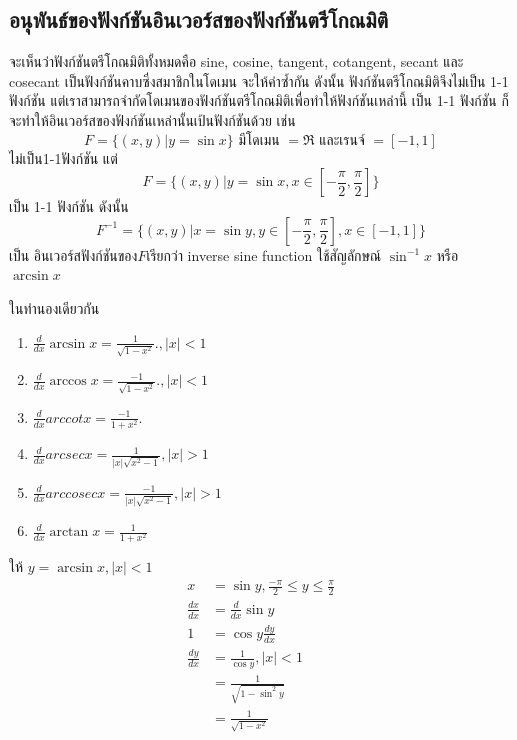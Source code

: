 \documentclass[
]{book}
\begin{document}
\subsection{อนุพันธ์ของฟังก์ชันอินเวอร์สของฟังก์ชันตรีโกณมิติ}\label{uxe2duxe19uxe1euxe19uxe18uxe02uxe2duxe07uxe1fuxe07uxe01uxe0auxe19uxe2duxe19uxe40uxe27uxe2duxe23uxe2auxe02uxe2duxe07uxe1fuxe07uxe01uxe0auxe19uxe15uxe23uxe42uxe01uxe13uxe21uxe15}

จะเห็นว่าฟังก์ชันตรีโกณมิติทั้งหมดคือ sine, cosine, tangent, cotangent, secant และ
cosecant เป็นฟังก์ชันคาบซึ่งสมาชิกในโดเมน จะให้ค่าซ้ำกัน ดังนั้น ฟังก์ชันตรีโกณมิติจึงไม่เป็น
1-1 ฟังก์ชัน แต่เราสามารถจำกัดโดเมนของฟังก์ชันตรีโกณมิติเพื่อทำให้ฟังก์ชันเหล่านี้ เป็น 1-1
ฟังก์ชัน ก็จะทำให้อินเวอร์สของฟังก์ชันเหล่านั้นเป้นฟังก์ชันด้วย เช่น
\[F=\{(x,y)|y=\sin x\} \text{ มีโดเมน }=\Re \text { และเรนจ์ }=[-1,1]\]
ไม่เป็น1-1ฟังก์ชัน แต่
\[F=\{(x,y)|y=\sin x , x\in \displaystyle [-\frac{\pi}{2},\frac{\pi}{2}]\}\]
เป็น 1-1 ฟังก์ชัน ดังนั้น
\[F^{-1}=\{(x,y)|x=\sin y , y\in \displaystyle [-\frac{\pi}{2},\frac{\pi}{2}],
x\in [-1,1]\}\] เป็น อินเวอร์สฟังก์ชันของ\(F\)เรียกว่า inverse sine function
ใช้สัญลักษณ์ \(\sin^{-1} x\) หรือ \(\arcsin x\)

ในทำนองเดียวกัน

\begin{enumerate}
\def\labelenumi{\arabic{enumi}.}
\item
  \(\displaystyle\frac{d}{dx} \arcsin x=\frac{1}{\sqrt{1-x^{2}}}., |x|<1\)
\item
  \(\displaystyle\frac{d}{dx} \arccos x=\frac{-1}{\sqrt{1-x^{2}}}., |x|<1\)
\item
  \(\displaystyle\frac{d}{dx} arccot x=\frac{-1}{1+x^{2}}.\)
\item
  \(\displaystyle\frac{d}{dx} arcsec x=\frac{1}{|x|\sqrt{x^{2}-1}}, |x|>1\)
\item
  \(\displaystyle\frac{d}{dx} arccosec x=\frac{-1}{|x|\sqrt{x^{2}-1}}, |x|>1\)
\item
  \(\displaystyle\frac{d}{dx} \arctan x=\frac{1}{1+x^{2}}\)
\end{enumerate}

ให้ \(y=\arcsin x , |x|<1\)\\
\begin{equation}   \begin{aligned}
x&=\sin y, \displaystyle \frac{-\pi}{2}\leq y \leq \frac{\pi}{2}\\
\displaystyle \frac{dx}{dx}&=\frac{d}{dx}\sin y\\
1&=\cos y \displaystyle \frac{dy}{dx}\\
\displaystyle \frac{dy}{dx}&=\frac{1}{\cos y} , |x|<1\\
&=\displaystyle \frac{1}{\sqrt{1-\sin^{2} y}}\\
&=\displaystyle \frac{1}{\sqrt{1-x^{2}}}
  \end{aligned} \end{equation}
\end{document}
